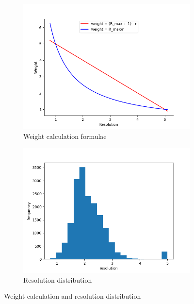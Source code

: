\documentclass[11pt]{article}
\begin{document}
\begin{figure}
     \centering
     \begin{subfigure}[b]{0.45\textwidth}
         \centering
    \includegraphics[scale=0.5]{images/graphingformula}
    \caption{Weight calculation formulae}
    \label{fig:graphingformula}
     \end{subfigure}
     \hfill
     \begin{subfigure}[b]{0.45\textwidth}
         \centering
        \includegraphics[scale=0.5]{images/resolutiondistribution}
        \caption{Resolution distribution}
        \label{fig:resolutiondistribution}
     \end{subfigure}
     \caption{ Weight calculation and resolution distribution}
     \label{fig:ResolutionWeightStats}
\end{figure}
\end{document}
